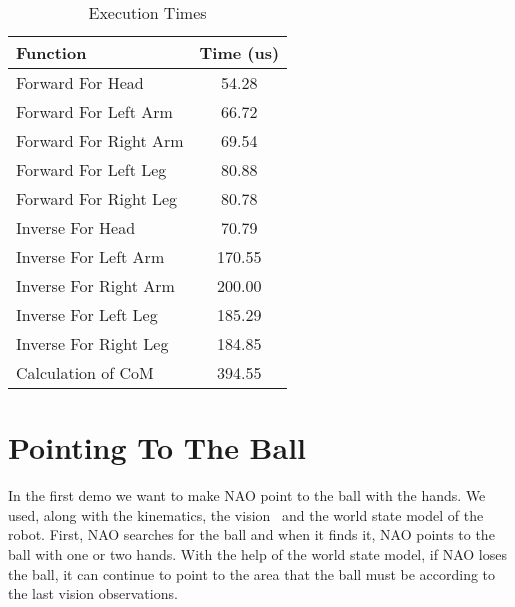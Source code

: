 \begin{table}[!h]
\centering
\caption{Execution Times}
\vspace*{0.06cm}
\begin{tabular}{|l|c|}
\hline
\textbf{Function} & \textbf{Time (us)}\\ \hline
Forward For Head & 54.28 \\
Forward For Left Arm & 66.72 \\
Forward For Right Arm & 69.54 \\
Forward For Left Leg & 80.88 \\
Forward For Right Leg & 80.78 \\
Inverse For Head & 70.79 \\
Inverse For Left Arm & 170.55 \\
Inverse For Right Arm & 200.00 \\
Inverse For Left Leg & 185.29 \\
Inverse For Right Leg & 184.85 \\
Calculation of CoM & 394.55 \\
\hline
\end{tabular}
\label{times}
\end{table}

\section{Pointing To The Ball}
In the first demo we want to make NAO point to the ball with the hands. We used, along with the kinematics, the vision~\cite{orfanoudakis2011} and the world state model of the robot. First, NAO searches for the ball and when it finds it, NAO points to the ball with one or two hands. With the help of the world state model, if NAO loses the ball, it can continue to point to the area that the ball must be according to the last vision observations.

